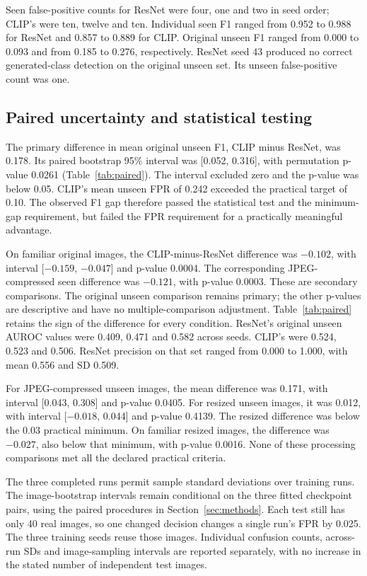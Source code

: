 Seen false-positive counts for ResNet were four, one and two in seed order; CLIP's were ten, twelve and ten. Individual seen F1 ranged from 0.952 to 0.988 for ResNet and 0.857 to 0.889 for CLIP. Original unseen F1 ranged from 0.000 to 0.093 and from 0.185 to 0.276, respectively. ResNet seed 43 produced no correct generated-class detection on the original unseen set. Its unseen false-positive count was one.
\FloatBarrier

\subsection{Paired uncertainty and statistical testing}
\label{sec:results-uncertainty}
The primary difference in mean original unseen F1, CLIP minus ResNet, was 0.178. Its paired bootstrap 95\% interval was [0.052, 0.316], with permutation p-value 0.0261 (Table~\ref{tab:paired}). The interval excluded zero and the p-value was below 0.05. CLIP's mean unseen FPR of 0.242 exceeded the practical target of 0.10. The observed F1 gap therefore passed the statistical test and the minimum-gap requirement, but failed the FPR requirement for a practically meaningful advantage.



On familiar original images, the CLIP-minus-ResNet difference was $-0.102$, with interval [$-0.159$, $-0.047$] and p-value 0.0004. The corresponding JPEG-compressed seen difference was $-0.121$, with p-value 0.0003. These are secondary comparisons. The original unseen comparison remains primary; the other p-values are descriptive and have no multiple-comparison adjustment. Table~\ref{tab:paired} retains the sign of the difference for every condition. ResNet's original unseen AUROC values were 0.409, 0.471 and 0.582 across seeds. CLIP's were 0.524, 0.523 and 0.506. ResNet precision on that set ranged from 0.000 to 1.000, with mean 0.556 and SD 0.509.

For JPEG-compressed unseen images, the mean difference was 0.171, with interval [0.043, 0.308] and p-value 0.0405. For resized unseen images, it was 0.012, with interval [$-0.018$, 0.044] and p-value 0.4139. The resized difference was below the 0.03 practical minimum. On familiar resized images, the difference was $-0.027$, also below that minimum, with p-value 0.0016. None of these processing comparisons met all the declared practical criteria.

The three completed runs permit sample standard deviations over training runs. The image-bootstrap intervals remain conditional on the three fitted checkpoint pairs, using the paired procedures in Section~\ref{sec:methods}. Each test still has only 40 real images, so one changed decision changes a single run's FPR by 0.025. The three training seeds reuse those images. Individual confusion counts, across-run SDs and image-sampling intervals are reported separately, with no increase in the stated number of independent test images.
\FloatBarrier

